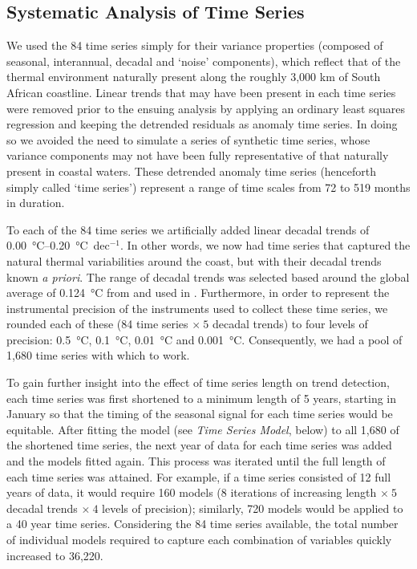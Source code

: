 \documentclass[]{ametsoc}
\begin{document}
\subsection{Systematic Analysis of Time Series}
We used the 84 time series simply for their variance properties (composed of seasonal, interannual, decadal and ‘noise’ components), which reflect that of the thermal environment naturally present along the roughly 3,000 km of South African coastline. Linear trends that may have been present in each time series were removed prior to the ensuing analysis by applying an ordinary least squares regression and keeping the detrended residuals as anomaly time series. In doing so we avoided the need to simulate a series of synthetic time series, whose variance components may not have been fully representative of that naturally present in coastal waters. These detrended anomaly time series (henceforth simply called `time series') represent a range of time scales from 72 to 519 months in duration.

To each of the 84 time series we artificially added linear decadal trends of \SIrange{0.00}{0.20}{\degreeCelsius}~dec$^{-1}$. In other words, we now had time series that captured the natural thermal variabilities around the coast, but with their decadal trends known \emph{a priori}. The range of decadal trends was selected based around the global average of \SI{0.124}{\degreeCelsius} from \citet{Kennedy2011} and used in \citet{IPCC2013}. Furthermore, in order to represent the instrumental precision of the instruments used to collect these time series, we rounded each of these (84 time series $\times~5$ decadal trends) to four levels of precision: \SI{0.5}{\degreeCelsius}, \SI{0.1}{\degreeCelsius}, \SI{0.01}{\degreeCelsius} and \SI{0.001}{\degreeCelsius}. Consequently, we had a pool of 1,680 time series with which to work.

To gain further insight into the effect of time series length on trend detection, each time series was first shortened to a minimum length of 5 years, starting in January so that the timing of the seasonal signal for each time series would be equitable. After fitting the model (see \emph{Time Series Model}, below) to all 1,680 of the shortened time series, the next year of data for each time series was added and the models fitted again. This process was iterated until the full length of each time series was attained. For example, if a time series consisted of 12 full years of data, it would require 160 models (8 iterations of increasing length $\times~5$ decadal trends $\times~4$ levels of precision); similarly, 720 models would be applied to a 40 year time series. Considering the 84 time series available, the total number of individual models required to capture each combination of variables quickly increased to 36,220.
\end{document}
